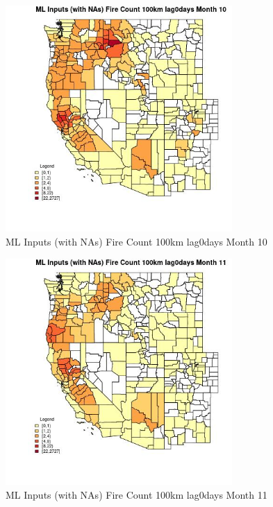 \begin{figure} 
\centering  
\includegraphics[width=0.77\textwidth]{Code_Outputs/Report_ML_input_PM25_Step4_part_f_de_duplicated_aveswNAs_CountyFire_Count_100km_lag0daysmedianMonth10.jpg} 
\caption{\label{fig:Report_ML_input_PM25_Step4_part_f_de_duplicated_aveswNAsCountyFire_Count_100km_lag0daysmedianMonth10}ML Inputs (with NAs) Fire Count 100km lag0days Month 10} 
\end{figure} 
 

\begin{figure} 
\centering  
\includegraphics[width=0.77\textwidth]{Code_Outputs/Report_ML_input_PM25_Step4_part_f_de_duplicated_aveswNAs_CountyFire_Count_100km_lag0daysmedianMonth11.jpg} 
\caption{\label{fig:Report_ML_input_PM25_Step4_part_f_de_duplicated_aveswNAsCountyFire_Count_100km_lag0daysmedianMonth11}ML Inputs (with NAs) Fire Count 100km lag0days Month 11} 
\end{figure} 
 

